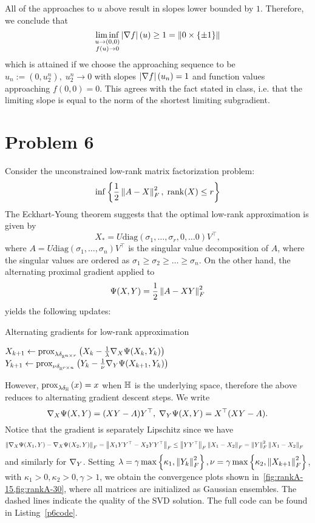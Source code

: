\documentclass[10pt]{article}
\begin{document}
All of the approaches to $u$ above result in slopes lower bounded by $1$.
Therefore, we conclude that
\[
    \liminf_{\substack{u \to (0, 0) \\ f(u) \to 0}} \left| \nabla f \right|(u) \geq 1
    = \left \| 0 \times \left\{ \pm 1 \right\} \right \|
\]
which is attained if we choose the approaching sequence to be $u_n := (0,
u_2^n), \; u_2^n \to 0$ with slopes $\left| \nabla f \right|(u_n) = 1$ and function
values approaching $f(0, 0) = 0$. This agrees with
the fact stated in class, i.e. that the limiting slope is equal to the norm of
the shortest limiting subgradient.

\section*{Problem 6}
Consider the unconstrained low-rank matrix factorization problem:
\[
    \inf\left\{ \frac{1}{2}\left \| A - X \right \|_F^2, \; \mathrm{rank}(X) \leq r \right\}
\]
The Eckhart-Young theorem suggests that the optimal low-rank approximation is
given by
\[
    X_* = U \mathrm{diag}(\sigma_1, \dots, \sigma_r, 0, \dots 0) V^\top,
\]
where $A = U \mathrm{diag}(\sigma_1, \dots, \sigma_n) V^\top$ is the singular
value
decomposition of $A$, where the singular values are ordered as $\sigma_1 \geq
\sigma_2 \geq \dots \geq \sigma_n$.
On the other hand, the alternating proximal gradient applied to
\[
    \Psi(X, Y) = \frac{1}{2} \left \| A - XY \right \|_F^2
\]
yields the following updates:
\begin{algorithm}
    \caption{Alternating gradients for low-rank approximation}
    \begin{algorithmic}
        \Repeat
            \State $X_{k+1} \gets \mathrm{prox}_{\lambda \delta_{\mathbb{R}^{n \times r}}}\left( 
                X_k - \frac{1}{\lambda} \nabla_X \Psi(X_k, Y_k) \right)$
            \State $Y_{k+1} \gets \mathrm{prox}_{\nu \delta_{\mathbb{R}^{r \times n}}}\left( 
                Y_k - \frac{1}{\nu} \nabla_Y \Psi(X_{k+1}, Y_k) \right)$
    \end{algorithmic}
\end{algorithm}
However, $\mathrm{prox}_{\lambda \delta_{\mathbb{H}}}\left( x \right) = x$ when $\mathbb{H}$ is the underlying
space, therefore the above reduces to alternating gradient descent steps.
We write
\[
    \nabla_X \Psi(X, Y) = (XY - A) Y^\top, \; \nabla_Y \Psi(X, Y) = X^\top (XY -
    A).
\]
Notice that the gradient is separately Lipschitz since we have
\begin{align*}
    \left \| \nabla_{X} \Psi(X_1, Y) - \nabla_X \Psi(X_2, Y) \right \|_F &=
        \left \| X_1 Y Y^\top - X_2 Y Y^\top \right \|_F \leq \left \| YY^\top \right \|_F
        \left \| X_1 - X_2 \right \|_F = \left \| Y \right \|_F^2 \left \| X_1 - X_2 \right \|_F
\end{align*}
and similarly for $\nabla_Y$. Setting $\lambda = \gamma \max\left\{ \kappa_1,
\left \| Y_k \right \|_F^2 \right\}, \nu = \gamma \max\left\{ \kappa_2,
\left \| X_{k+1} \right \|_F^2 \right\}$, with $\kappa_1 > 0, \kappa_2 > 0, \gamma > 1$, we
obtain the convergence plots shown in~\cref{fig:rankA-15,fig:rankA-30}, where
all matrices are initialized as Gaussian ensembles. The dashed lines indicate
the quality of the SVD solution. The full code can be found
in Listing~\ref{p6code}.
\end{document}
